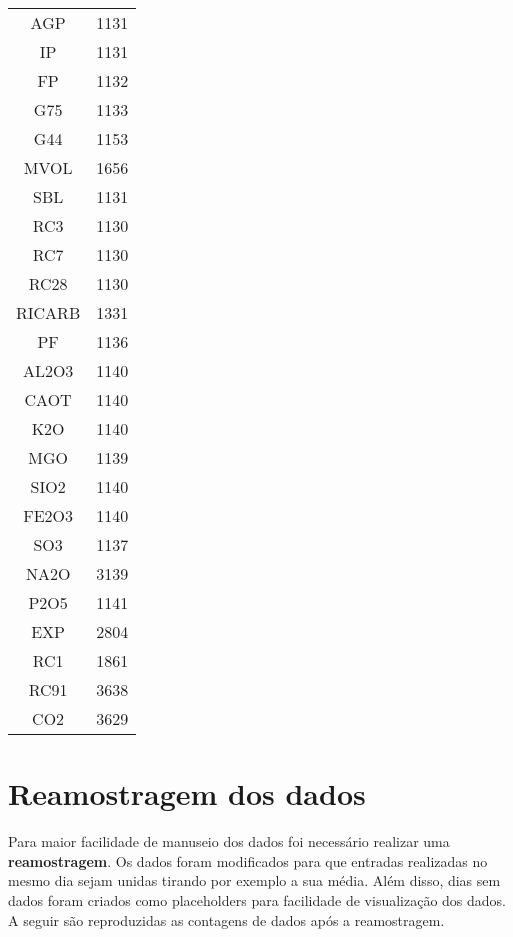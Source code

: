 \begin{center}
\begin{tabular}{ c c }
AGP     &  1131\\
IP      &  1131\\
FP      &  1132\\
G75    &  1133\\
G44   &  1153\\
MVOL    &  1656\\
SBL     &  1131\\
RC3     &  1130\\
RC7     &  1130\\
RC28    &  1130\\
RICARB  &  1331\\
PF      &  1136\\
AL2O3   &  1140\\
CAOT    &  1140\\
K2O     &  1140\\
MGO     &  1139\\
SIO2    &  1140\\
FE2O3   &  1140\\
SO3     &  1137\\
NA2O    &  3139\\
P2O5    &  1141\\
EXP     &  2804\\
RC1     &  1861\\
RC91    &  3638\\
CO2     &  3629 
\end{tabular}
\end{center}



\section{Reamostragem dos dados}
Para maior facilidade de manuseio dos dados foi necessário realizar uma
\textbf{reamostragem}. Os dados foram modificados para que entradas realizadas no
mesmo dia sejam unidas tirando por exemplo a sua média. Além disso, dias sem
dados foram criados como placeholders para facilidade de visualização dos dados.
A seguir são reproduzidas as contagens de dados após a reamostragem.


